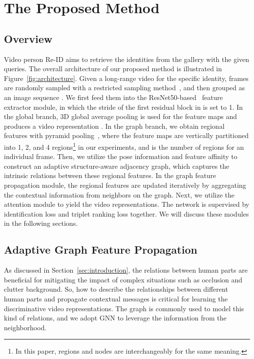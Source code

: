\documentclass[journal]{IEEEtran}
\begin{document}
\section{The Proposed Method}\label{sec:the proposed method}
\subsection{Overview}\label{sec:overview}
Video person Re-ID aims to retrieve the identities from the gallery with the given queries. The overall architecture of our proposed method is illustrated in Figure~\ref{fig:architecture}. Given a long-range video for the specific identity,  frames are randomly sampled with a restricted sampling method~\cite{Zolfaghari_2018_ECCV,Li_2018_CVPR}, and then grouped as an image sequence . We first feed them into the ResNet50-based~\cite{He_2016_CVPR} feature extractor module, in which the stride of the first residual block in  is set to 1. In the global branch, 3D global average pooling is used for the feature maps and produces a video representation . In the graph branch, we obtain regional features  with pyramid pooling~\cite{Fuyang_2019_AAAI}, where the feature maps are vertically partitioned into 1, 2, and 4 regions\footnote{In this paper, regions and nodes are interchangeably for the same meaning.} in our experiments, and  is the number of regions for an individual frame. Then, we utilize the pose information and feature affinity to construct an adaptive structure-aware adjacency graph, which captures the intrinsic relations between these regional features. In the graph feature propagation module, the regional features are updated iteratively by aggregating the contextual information from neighbors on the graph. Next, we utilize the attention module to yield the video representations. The network is supervised by identification loss and triplet ranking loss together. We will discuss these modules in the following sections.

\subsection{Adaptive Graph Feature Propagation}\label{sec:feature propagation}
As discussed in Section~\ref{sec:introduction}, the relations between human parts are beneficial for mitigating the impact of complex situations such as occlusion and clutter background. So, how to describe the relationships between different human parts and propagate contextual messages is critical for learning the discriminative video representations. The graph is commonly used to model this kind of relations, and we adopt GNN to leverage the information from the neighborhood.\\
\end{document}

